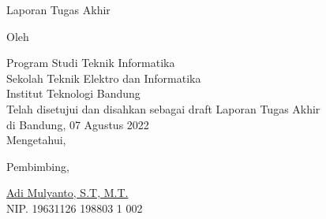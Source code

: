 \clearpage
\pagestyle{empty}

\begin{center}
    \smallskip

    \Large \bfseries \MakeUppercase{\thetitle}
    \vfill

    \Large Laporan Tugas Akhir
    \vfill

    \large Oleh

    \Large \theauthor

    \large Program Studi Teknik Informatika \\

    \normalsize \normalfont
    Sekolah Teknik Elektro dan Informatika \\
    Institut Teknologi Bandung \\

    \vfill
    \normalsize \normalfont
    Telah disetujui dan disahkan sebagai draft Laporan Tugas Akhir \\
    di Bandung, 07 Agustus 2022 \\
    Mengetahui,

    \vspace{0.5cm}
    Pembimbing,

    \vfill
    \underline{Adi Mulyanto, S.T, M.T.} \\
    NIP. 19631126 198803 1 002

\end{center}
\clearpage
